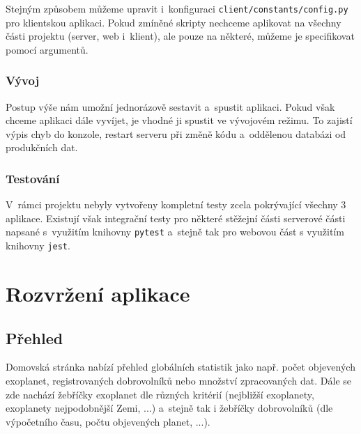 \documentclass[a4paper,12pt]{article}
\def\code#1{\texttt{#1}}
\begin{document}
{{{{{{{{{{{

Stejným způsobem můžeme upravit i~konfiguraci \code{client/constants/config.py} pro klientskou aplikaci. Pokud zmíněné skripty nechceme aplikovat na všechny části projektu (server, web i~klient), ale pouze na některé, můžeme je specifikovat pomocí argumentů.



\vspace{-10pt}

\subsubsection{Vývoj}

Postup výše nám umožní jednorázově sestavit a~spustit aplikaci. Pokud však chceme aplikaci dále vyvíjet, je vhodné ji spustit ve vývojovém režimu. To zajistí výpis chyb do konzole, restart serveru při změně kódu a~oddělenou databázi od produkčních dat.



\subsubsection{Testování}

V~rámci projektu nebyly vytvořeny kompletní testy zcela pokrývající všechny 3 aplikace. Existují však integrační testy pro některé stěžejní části serverové části napsané s~využitím knihovny \code{pytest} a~stejně tak pro webovou část s využitím knihovny \code{jest}.



\section{Rozvržení aplikace}

\subsection{Přehled}

Domovská stránka nabízí přehled globálních statistik jako např. počet objevených exoplanet, registrovaných dobrovolníků nebo množství zpracovaných dat. Dále se zde nachází žebříčky exoplanet dle různých kritérií (nejbližší exoplanety, exoplanety nejpodobnější Zemi, ...) a~stejně tak i žebříčky dobrovolníků (dle výpočetního času, počtu objevených planet, ...).

}}}}}}}}}}}
\end{document}
